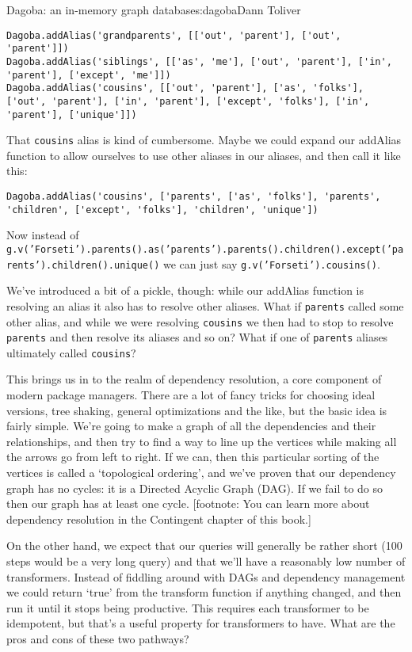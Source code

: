 \begin{aosachapter}{Dagoba: an in-memory graph database}{s:dagoba}{Dann Toliver}
\begin{verbatim}
Dagoba.addAlias('grandparents', [['out', 'parent'], ['out', 'parent']])
Dagoba.addAlias('siblings', [['as', 'me'], ['out', 'parent'], ['in', 'parent'], ['except', 'me']])
Dagoba.addAlias('cousins', [['out', 'parent'], ['as', 'folks'], ['out', 'parent'], ['in', 'parent'], ['except', 'folks'], ['in', 'parent'], ['unique']])
\end{verbatim}

That \texttt{cousins} alias is kind of cumbersome. Maybe we could expand
our addAlias function to allow ourselves to use other aliases in our
aliases, and then call it like this:

\begin{verbatim}
Dagoba.addAlias('cousins', ['parents', ['as', 'folks'], 'parents', 'children', ['except', 'folks'], 'children', 'unique'])
\end{verbatim}

Now instead of
\texttt{g.v('Forseti').parents().as('parents').parents().children().except('parents').children().unique()}
we can just say \texttt{g.v('Forseti').cousins()}.

We've introduced a bit of a pickle, though: while our addAlias function
is resolving an alias it also has to resolve other aliases. What if
\texttt{parents} called some other alias, and while we were resolving
\texttt{cousins} we then had to stop to resolve \texttt{parents} and
then resolve its aliases and so on? What if one of \texttt{parents}
aliases ultimately called \texttt{cousins}?

This brings us in to the realm of dependency resolution, a core
component of modern package managers. There are a lot of fancy tricks
for choosing ideal versions, tree shaking, general optimizations and the
like, but the basic idea is fairly simple. We're going to make a graph
of all the dependencies and their relationships, and then try to find a
way to line up the vertices while making all the arrows go from left to
right. If we can, then this particular sorting of the vertices is called
a `topological ordering', and we've proven that our dependency graph has
no cycles: it is a Directed Acyclic Graph (DAG). If we fail to do so
then our graph has at least one cycle. {[}footnote: You can learn more
about dependency resolution in the Contingent chapter of this book.{]}

On the other hand, we expect that our queries will generally be rather
short (100 steps would be a very long query) and that we'll have a
reasonably low number of transformers. Instead of fiddling around with
DAGs and dependency management we could return `true' from the transform
function if anything changed, and then run it until it stops being
productive. This requires each transformer to be idempotent, but that's
a useful property for transformers to have. What are the pros and cons
of these two pathways?


\end{aosachapter}
